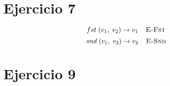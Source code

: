 \documentclass[11pt]{article}
\begin{document}

\section*{Ejercicio 7}


\begin{prooftree}


\end{prooftree}

\begin{prooftree}


\end{prooftree}

\[
    fst \; (v_1, \; v_2) \rightarrow v_1 \; \; \; \; \textsc{E-Fst}
\]
\[
    snd \; (v_1, \; v_2) \rightarrow v_2 \; \; \; \; \textsc{E-Snd}
\]

\begin{prooftree}


\end{prooftree}

\begin{prooftree}


\end{prooftree}




\section*{Ejercicio 9}
\end{document}
